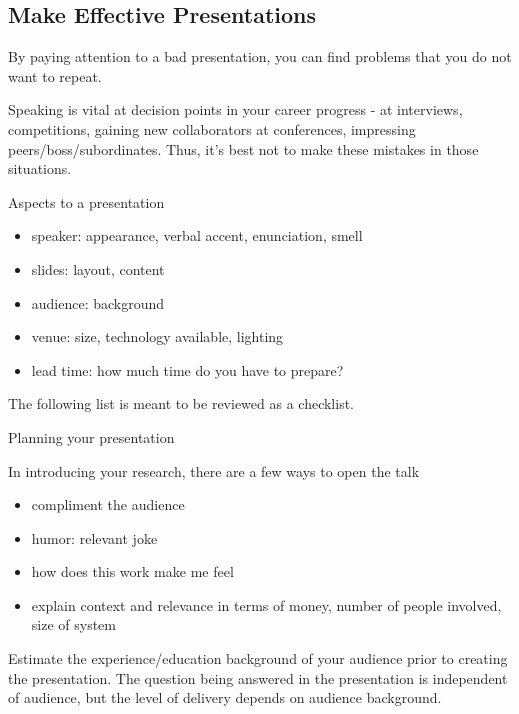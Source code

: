 \subsection{Make Effective Presentations\label{sec:presentations}}


By paying attention to a bad presentation, you can find problems that you do not want to repeat.

Speaking is vital at decision points in your career progress - at interviews, competitions, gaining new collaborators at conferences, impressing peers/boss/subordinates. Thus, it's best not to make these mistakes in those situations.

Aspects to a presentation
\begin{itemize}
    \item speaker: appearance, verbal accent, enunciation, smell
    \item slides: layout, content
    \item audience: background
    \item venue: size, technology available, lighting
    \item lead time: how much time do you have to prepare?
\end{itemize}
The following list is meant to be reviewed as a checklist.

Planning your presentation

In introducing your research, there are a few ways to open the talk
\begin{itemize}
    \item compliment the audience
    \item humor: relevant joke
    \item how does this work make me feel
    \item explain context and relevance in terms of money, number of people involved, size of system
\end{itemize}
Estimate the experience/education background of your audience prior to creating the presentation. The question being answered in the presentation is independent of audience, but the level of delivery depends on audience background.


